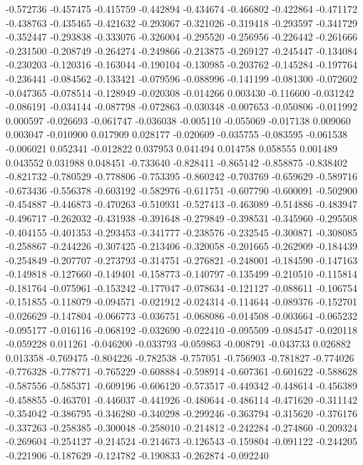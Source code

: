-0.572736
-0.457475
-0.415759
-0.442894
-0.434674
-0.466802
-0.422864
-0.471172
-0.438763
-0.435465
-0.421632
-0.293067
-0.321026
-0.319418
-0.293597
-0.341729
-0.352447
-0.293838
-0.333076
-0.326004
-0.295520
-0.256956
-0.226442
-0.261666
-0.231500
-0.208749
-0.264274
-0.249866
-0.213875
-0.269127
-0.245447
-0.134084
-0.230203
-0.120316
-0.163044
-0.190104
-0.130985
-0.203762
-0.145284
-0.197764
-0.236441
-0.084562
-0.133421
-0.079596
-0.088996
-0.141199
-0.081300
-0.072602
-0.047365
-0.078514
-0.128949
-0.020308
-0.014266
0.003430
-0.116600
-0.031242
-0.086191
-0.034144
-0.087798
-0.072863
-0.030348
-0.007653
-0.050806
-0.011992
0.000597
-0.026693
-0.061747
-0.036038
-0.005110
-0.055069
-0.017138
0.009060
0.003047
-0.010900
0.017909
0.028177
-0.020609
-0.035755
-0.083595
-0.061538
-0.006021
0.052341
-0.012822
0.037953
0.041494
0.014758
0.058555
0.001489
0.043552
0.031988
0.048451
-0.733640
-0.828411
-0.865142
-0.858875
-0.838402
-0.821732
-0.780529
-0.778806
-0.753395
-0.860242
-0.703769
-0.659629
-0.589716
-0.673436
-0.556378
-0.603192
-0.582976
-0.611751
-0.607790
-0.600091
-0.502900
-0.454887
-0.446873
-0.470263
-0.510931
-0.527413
-0.463089
-0.514886
-0.483947
-0.496717
-0.262032
-0.431938
-0.391648
-0.279849
-0.398531
-0.345960
-0.295508
-0.404155
-0.401353
-0.293453
-0.341777
-0.238576
-0.232545
-0.300871
-0.308085
-0.258867
-0.244226
-0.307425
-0.213406
-0.320058
-0.201665
-0.262909
-0.184439
-0.254849
-0.207707
-0.273793
-0.314751
-0.276821
-0.248001
-0.184590
-0.147163
-0.149818
-0.127660
-0.149401
-0.158773
-0.140797
-0.135499
-0.210510
-0.115814
-0.181764
-0.075961
-0.153242
-0.177047
-0.078634
-0.121127
-0.088611
-0.106754
-0.151855
-0.118079
-0.094571
-0.021912
-0.024314
-0.114644
-0.089376
-0.152701
-0.026629
-0.147804
-0.066773
-0.036751
-0.068086
-0.014508
-0.003664
-0.065232
-0.095177
-0.016116
-0.068192
-0.032690
-0.022410
-0.095509
-0.084547
-0.020118
-0.059228
0.011261
-0.046200
-0.033793
-0.059863
-0.008791
-0.043733
0.026882
0.013358
-0.769475
-0.804226
-0.782538
-0.757051
-0.756903
-0.781827
-0.774026
-0.776328
-0.778771
-0.765229
-0.608884
-0.598914
-0.607361
-0.601622
-0.588628
-0.587556
-0.585371
-0.609196
-0.606120
-0.573517
-0.449342
-0.448614
-0.456389
-0.458855
-0.463701
-0.446037
-0.441926
-0.480644
-0.486114
-0.471620
-0.311142
-0.354042
-0.386795
-0.346280
-0.340298
-0.299246
-0.363794
-0.315620
-0.376176
-0.337263
-0.258385
-0.300048
-0.258010
-0.214812
-0.242284
-0.274860
-0.209324
-0.269604
-0.254127
-0.214524
-0.214673
-0.126543
-0.159804
-0.091122
-0.244205
-0.221906
-0.187629
-0.124782
-0.190833
-0.262874
-0.092240
